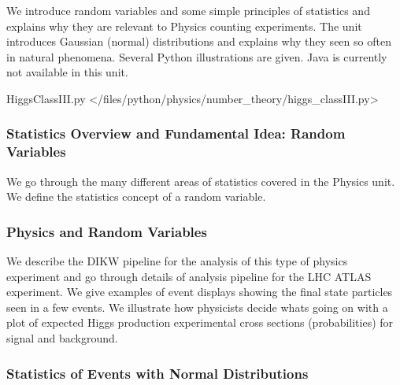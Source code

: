 We introduce random variables and some simple principles of statistics
and explains why they are relevant to Physics counting experiments. The
unit introduces Gaussian (normal) distributions and explains why they
seen so often in natural phenomena. Several Python illustrations are
given. Java is currently not available in this unit.


HiggsClassIII.py \textless{}/files/python/physics/number\_theory/higgs\_classIII.py\textgreater{}

\subsubsection{Statistics Overview and Fundamental Idea: Random
Variables}\label{statistics-overview-and-fundamental-idea-random-variables}

We go through the many different areas of statistics covered in the
Physics unit. We define the statistics concept of a random variable.


\subsubsection{Physics and Random
Variables}\label{physics-and-random-variables}

We describe the DIKW pipeline for the analysis of this type of physics
experiment and go through details of analysis pipeline for the LHC ATLAS
experiment. We give examples of event displays showing the final state
particles seen in a few events. We illustrate how physicists decide
whats going on with a plot of expected Higgs production experimental
cross sections (probabilities) for signal and background.



\subsubsection{Statistics of Events with Normal
Distributions}\label{statistics-of-events-with-normal-distributions}

